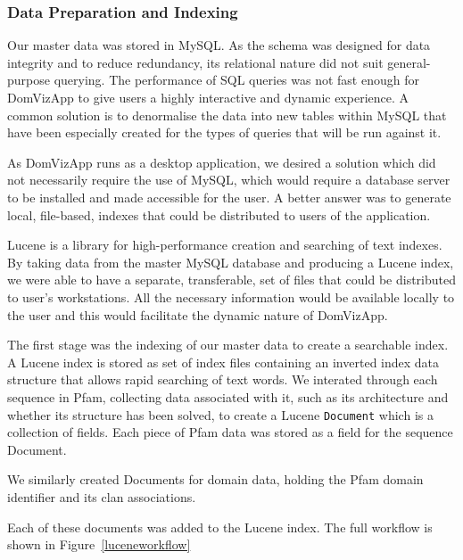 \subsubsection{Data Preparation and Indexing}
Our master data was stored in MySQL. As the schema was designed for data integrity and to reduce redundancy, its relational nature did not suit general-purpose querying. The performance of SQL queries was not fast enough for DomVizApp to give users a highly interactive and dynamic experience. A common solution is to denormalise the data into new tables within MySQL that have been especially created for the types of queries that will be run against it.

As DomVizApp runs as a desktop application, we desired a solution which did not necessarily require the use of MySQL, which would require a database server to be installed and made accessible for the user. A better answer was to generate local, file-based, indexes that could be distributed to users of the application.

Lucene is a library for high-performance creation and searching of text indexes. By taking data from the master MySQL database and producing a Lucene index, we were able to have a separate, transferable, set of files that could be distributed to user's workstations. All the necessary information would be available locally to the user and this would facilitate the dynamic nature of DomVizApp.

The first stage was the indexing of our master data to create a searchable index. A Lucene index is stored as set of index files containing an inverted index data structure that allows rapid searching of text words. We interated through each sequence in Pfam, collecting data associated with it, such as its architecture and whether its structure has been solved, to create a Lucene \texttt{Document} which is a collection of fields. Each piece of Pfam data was stored as a field for the sequence Document.

We similarly created Documents for domain data, holding the Pfam domain identifier and its clan associations. 

Each of these documents was added to the Lucene index. The full workflow is shown in Figure~\ref{luceneworkflow}

